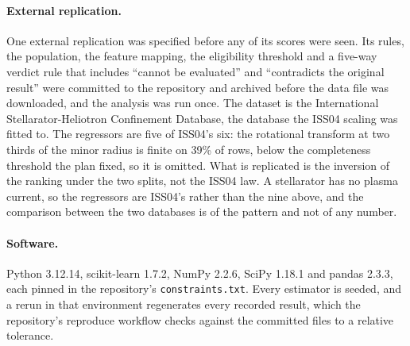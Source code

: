 \documentclass[aip,pop,preprint,amsmath,amssymb]{revtex4-2}
\begin{document}
\paragraph{External replication.} One external replication was specified
before any of its scores were seen. Its rules, the population, the feature
mapping, the eligibility threshold and a five-way verdict rule that includes
``cannot be evaluated'' and ``contradicts the original result'' were committed
to the repository and archived before the data file was downloaded, and the
analysis was run once. The dataset is the International Stellarator-Heliotron
Confinement Database, the database the ISS04 scaling\cite{iss04} was fitted
to. The regressors are five of ISS04's six: the rotational transform at two
thirds of the minor radius is finite on 39\% of rows, below the completeness
threshold the plan fixed, so it is omitted. What is replicated is the
inversion of the ranking under the two splits, not the ISS04 law.
A stellarator has no plasma current, so the regressors are ISS04's rather than
the nine above, and the comparison between the two databases is of the pattern
and not of any number.

\paragraph{Software.} Python 3.12.14, scikit-learn 1.7.2, NumPy 2.2.6, SciPy
1.18.1 and pandas 2.3.3, each pinned in the repository's
\texttt{constraints.txt}. Every estimator is seeded, and a rerun in that
environment regenerates every recorded result, which the repository's
reproduce workflow checks against the committed files to a relative
tolerance.
\end{document}
